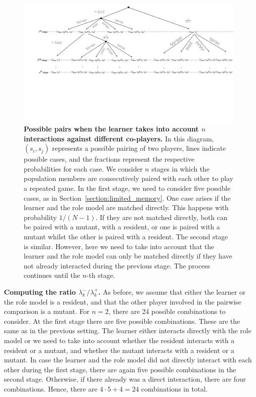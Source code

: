 \documentclass[11pt]{article}
\def\strategy{s}
\theoremstyle{plainCl1}
\theoremstyle{plainCl2}
\begin{document}

\begin{figure}[t]
  \centering 
  \includegraphics[width=\textwidth]{static/matching_tree.pdf}
  \caption{\textbf{Possible pairs when the learner takes into account $n$ interactions against different co-players.} 
  In this diagram, \((\strategy_i, \strategy_j)\) represents a possible pairing of two players, lines indicate possible cases, and the fractions represent the respective probabilities for each case. 
  We consider $n$ stages in which the population members are consecutively paired with each other to play a repeated game. 
  In the first stage, we need to consider five possible cases, as in Section~\ref{section:limited_memory}.
  One case arises if the learner and the role model are matched directly. 
  This happens with probability $1/(N\!-\!1)$.
  If they are not matched directly, both can be paired with a mutant, with a resident, or one is paired with a mutant
  whilst the other is paired with a resident.
  The second stage is similar. 
  However, here we need to take into account that the learner and the role model can only be matched directly if they have not already interacted during the previous stage. 
  The process continues until the $n$-th stage.}\label{fig:matching_tree}
\end{figure}


\noindent
{\bf Computing the ratio $\lambda^-_k/\lambda^+_k$.}
As before, we assume that either the learner or the role model is a resident, and that the other player involved in the pairwise comparison is a mutant. For $n\!=\!2$, there are 24 possible combinations to consider. 
At the first stage there are five possible combinations. 
These are the same as in the previous setting. 
The learner either interacts directly with the role model or we need to take into account whether the resident interacts with a resident or a mutant, and whether the mutant interacts with a resident or a mutant. 
In case the learner and the role model did not directly interact with each other during the first stage, there are again five possible combinations in the second stage. 
Otherwise, if there already was a direct interaction, there are four combinations. 
Hence, there are $4\!\cdot\!5 + 4=24$ combinations in total. 
\end{document}
